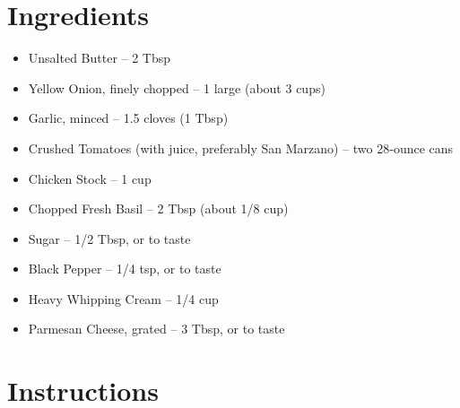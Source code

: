 




\section*{Ingredients}

\begin{itemize}
      \item Unsalted Butter – 2 Tbsp
      \item[\cut] Yellow Onion, finely chopped – 1 large (about 3 cups)
      \item[\cut] Garlic, minced – 1.5 cloves (1 Tbsp)
      \item Crushed Tomatoes (with juice, preferably San Marzano) – two 28‑ounce cans
      \item[\measure] Chicken Stock – 1 cup
      \item[\cut] Chopped Fresh Basil – 2 Tbsp (about 1/8 cup)
      \item[\measure] Sugar – 1/2 Tbsp, or to taste
      \item[\measure] Black Pepper – 1/4 tsp, or to taste
      \item[\measure] Heavy Whipping Cream – 1/4 cup
      \item Parmesan Cheese, grated – 3 Tbsp, or to taste
\end{itemize}

\newpage
{}
\section*{Instructions}

